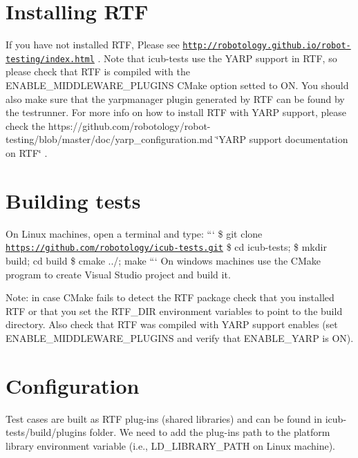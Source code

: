 \hypertarget{installation_installing_rtf}{}\section{Installing R\-T\-F}\label{installation_installing_rtf}
If you have not installed R\-T\-F, Please see \href{http://robotology.github.io/robot-testing/index.html}{\tt http\-://robotology.\-github.\-io/robot-\/testing/index.\-html} . Note that {\ttfamily icub-\/tests} use the Y\-A\-R\-P support in R\-T\-F, so please check that R\-T\-F is compiled with the {\ttfamily E\-N\-A\-B\-L\-E\-\_\-\-M\-I\-D\-D\-L\-E\-W\-A\-R\-E\-\_\-\-P\-L\-U\-G\-I\-N\-S} C\-Make option setted to O\-N. You should also make sure that the yarpmanager plugin generated by R\-T\-F can be found by the testrunner. For more info on how to install R\-T\-F with Y\-A\-R\-P support, please check the https\-://github.com/robotology/robot-\/testing/blob/master/doc/yarp\-\_\-configuration.\-md \char`\"{}\-Y\-A\-R\-P support documentation on R\-T\-F\char`\"{} .\hypertarget{installation_building_tests}{}\section{Building tests}\label{installation_building_tests}
On Linux machines, open a terminal and type\-: ``` \$ git clone \href{https://github.com/robotology/icub-tests.git}{\tt https\-://github.\-com/robotology/icub-\/tests.\-git} \$ cd icub-\/tests; \$ mkdir build; cd build \$ cmake ../; make ``` On windows machines use the C\-Make program to create Visual Studio project and build it.

Note\-: in case C\-Make fails to detect the R\-T\-F package check that you installed R\-T\-F or that you set the R\-T\-F\-\_\-\-D\-I\-R environment variables to point to the build directory. Also check that R\-T\-F was compiled with Y\-A\-R\-P support enables (set {\ttfamily E\-N\-A\-B\-L\-E\-\_\-\-M\-I\-D\-D\-L\-E\-W\-A\-R\-E\-\_\-\-P\-L\-U\-G\-I\-N\-S} and verify that {\ttfamily E\-N\-A\-B\-L\-E\-\_\-\-Y\-A\-R\-P} is O\-N).\hypertarget{installation_soncifugration}{}\section{Configuration}\label{installation_soncifugration}
Test cases are built as R\-T\-F plug-\/ins (shared libraries) and can be found in {\ttfamily icub-\/tests/build/plugins} folder. We need to add the plug-\/ins path to the platform library environment variable (i.\-e., {\ttfamily L\-D\-\_\-\-L\-I\-B\-R\-A\-R\-Y\-\_\-\-P\-A\-T\-H} on Linux machine).

